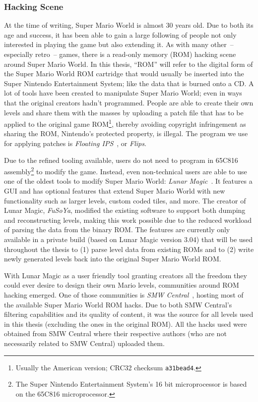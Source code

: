 \subsubsection{Hacking Scene}
\label{sec:hacks}

At the time of writing, Super Mario World is almost 30 years old. Due
to both its age and success, it has been able to gain a large
following of people not only interested in playing the game but also
extending it. As with many other~-- especially retro~-- games, there is
a read-only memory (ROM) hacking scene around Super Mario World. In
this thesis, ``ROM'' will refer to the digital form of the Super Mario
World ROM cartridge that would usually be inserted into the Super
Nintendo Entertainment System; like the data that is burned onto a CD.
A lot of tools have been created to manipulate Super Mario World; even
in ways that the original creators hadn't programmed. People are able
to create their own levels and share them with the masses by uploading
a patch file that has to be applied to the original game
ROM\footnote{Usually the American version; CRC32 checksum
  \texttt{a31bead4}.}, thereby avoiding copyright infringement as
sharing the ROM, Nintendo's protected property, is illegal. The
program we use for applying patches is \emph{Floating
  IPS}~\cite{alcaroAlcaroFlips2019,FloatingIPSFlips}, or \emph{Flips}.

Due to the refined tooling available, users do not need to program in
65C816 assembly\footnote{The Super Nintendo Entertainment System's 16
  bit microprocessor is based on the 65C816 microprocessor.} to modify
the game. Instead, even non-technical users are able to use one of the
oldest tools to modify Super Mario World: \emph{Lunar
  Magic}~\cite{FuSoYaNicheLunar}. It features a GUI and has optional
features that extend Super Mario World with new functionality such as
larger levels, custom coded tiles, and more. The creator of Lunar
Magic, \emph{FuSoYa}, modified the existing software to support both
dumping and reconstructing levels, making this work possible due to
the reduced workload of parsing the data from the binary ROM. The
features are currently only available in a private build (based on
Lunar Magic version 3.04) that will be used throughout the thesis to
(1) parse level data from existing ROMs and to (2) write newly
generated levels back into the original Super Mario World ROM.

With Lunar Magic as a user friendly tool granting creators all the
freedom they could ever desire to design their own Mario levels,
communities around ROM hacking emerged. One of those communities is
\emph{SMW Central}~\cite{SMWCentralYour}, hosting most of the
available Super Mario World ROM hacks. Due to both SMW Central's
filtering capabilities and its quality of content, it was the source
for all levels used in this thesis (excluding the ones in the original
ROM). All the hacks used were obtained from SMW Central where their
respective authors (who are not necessarily related to SMW Central)
uploaded them.

